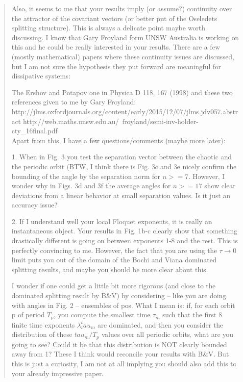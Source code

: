 \begin{description}
\begin{quotation}
Also, it seems to me that your results imply (or assume?) continuity over
the attractor of the covariant vectors (or better
put of the Oseledets splitting structure). This is always a delicate point
 maybe worth discussing. I know that Gary Froyland
form UNSW Australia is working on this and he could be really interested in
your results. There are a few  (mostly
mathematical) papers where these continuity issues are discussed, but I am not
sure the hypothesis they put forward are
meaningful for dissipative systems:

The Ershov and Potapov one in Physica D 118, 167 (1998)
and these two references given to me by Gary Froyland:\\
http://jlms.oxfordjournals.org/content/early/2015/12/07/jlms.jdv057.abstract
http://web.maths.unsw.edu.au/~froyland/semi-inv-holder-cty\_16final.pdf \\

Apart from this, I have a few questions/comments (maybe more later):

1.
When in Fig. 3 you test the separation vector between the chaotic and the
periodic orbit (BTW, I think there is
Fig. 3c and 3e nicely
 confirm the bounding of the angle by the separation norm for $n>=7$.
However, I wonder why in Figs. 3d and 3f the average angles for $n>=17$ show
clear deviations
from a linear behavior at small separation values. Is it just an accuracy issue?


2.
If I understand well your local Floquet exponents, it is really an
 instantaneous object. Your results in Fig. 1b-c clearly show that something
 drastically different is going on between
exponents 1-8 and the rest. This is perfectly convincing to me.
However, the fact that you are using the $\tau \to 0$ limit puts you out of the domain of the
Bochi and Viana dominated splitting results, and maybe you should be more clear about this.

I wonder if one could get a little bit more rigorous (and close to the
 dominated splitting result by B\&V) by considering --
like you are doing with angles in Fig. 2 -- ensembles of pos.
What I mean is: if, for each orbit p of period $T_p$, you compute the
smallest time $\tau_m$ such that the first 8 finite time
exponents $\lambda_i^tau_m$ are dominated, and then you consider the distribution
 of these $tau_m/T_p$ values over all periodic
orbits, what are you going to see?
Could it be that this distribution is NOT clearly  bounded away from 1? These I think
would reconcile your results with B\&V.
But this is just a curiosity, I am not at all implying you should also add this to
your already impressive paper.


\end{quotation}
\end{description}
